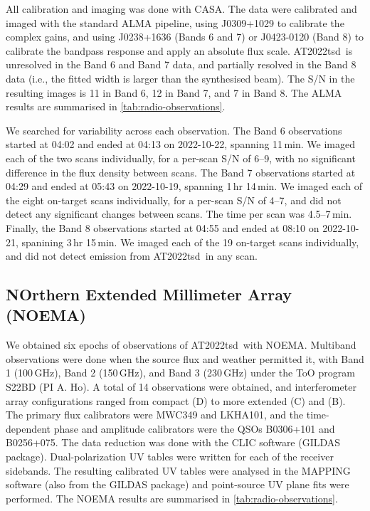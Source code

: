 \documentclass{nature_plusfigure}
\newcommand{\at}{AT2022tsd}
\begin{document}
\begin{methods}

All calibration and imaging was done with CASA.
The data were calibrated and imaged
with the standard ALMA pipeline, using J0309+1029 to calibrate the complex gains, and using J0238+1636 (Bands 6 and 7) or J0423-0120 (Band 8) to calibrate the bandpass response and apply an absolute flux scale.
\at\ is unresolved in the Band 6 and Band 7 data, and partially resolved in the Band 8 data (i.e., the fitted width is larger than the synthesised beam).
The S/N in the resulting images is 11 in Band 6, 12 in Band 7, and 7 in Band 8.
The ALMA results are summarised in \ref{tab:radio-observations}.

We searched for variability across each observation. The Band 6 observations started at 04:02 and ended at 04:13 on 2022-10-22, spanning 11\,min. We imaged each of the two scans individually, for a per-scan S/N of 6--9, with no significant difference in the flux density between scans.
The Band 7 observations started at 04:29 and ended at 05:43 on 2022-10-19, spanning 1\,hr 14\,min.
We imaged each of the eight on-target scans individually, for a per-scan S/N of 4--7, and did not detect any significant changes between scans. The time per scan was 4.5--7\,min.
Finally, the Band 8 observations started at 04:55 and ended at 08:10 on 2022-10-21, spanining 3\,hr 15\,min. We imaged each of the 19 on-target scans individually, and did not detect emission from \at\ in any scan.

\subsection{NOrthern Extended Millimeter Array (NOEMA)}
\label{Methods:NOEMA}

We obtained six epochs of observations of \at\ with NOEMA. Multiband observations were done when the source flux and weather permitted it, with Band 1 (100\,GHz), Band 2 (150\,GHz), and Band 3 (230\,GHz) under the ToO program S22BD (PI A. Ho). A total of 14 observations were obtained, and interferometer array configurations ranged from compact (D) to more extended (C) and (B). The primary flux calibrators were MWC349 and LKHA101, and the time-dependent phase and amplitude calibrators were the QSOs B0306+101 and B0256+075. The data reduction was done with the CLIC software (GILDAS package\cite{GILDAS}). 
Dual-polarization UV tables were written for each of the receiver sidebands. The resulting calibrated UV tables were analysed in the MAPPING software (also from the GILDAS package) and point-source UV plane fits were performed.
The NOEMA results are summarised in \ref{tab:radio-observations}.


\end{methods}
\end{document}
